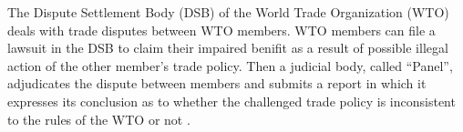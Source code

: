 The Dispute Settlement Body (DSB) of the World Trade Organization (WTO) deals with trade disputes between WTO members.
WTO members can file a lawsuit in the DSB to claim their impaired benifit as a result of possible illegal action of the other member's trade policy.
Then a judicial body, called ``Panel'', adjudicates the dispute between members and submits a report in which it expresses
its conclusion as to whether the challenged trade policy is inconsistent to the rules of the WTO or not \citep{world2017handbook}.

 

